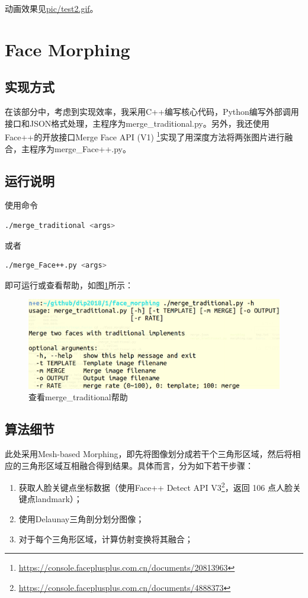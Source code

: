 \documentclass[a4paper]{article}
\begin{document}
动画效果见\underline{pic/test2.gif}。

\section{Face Morphing}
\subsection{实现方式}

在该部分中，考虑到实现效率，我采用C++编写核心代码，Python编写外部调用接口和JSON格式处理，主程序为merge\_traditional.py。另外，我还使用Face++的开放接口Merge Face API (V1) \footnote{\url{https://console.faceplusplus.com.cn/documents/20813963}}实现了用深度方法将两张图片进行融合，主程序为merge\_Face++.py。

\subsection{运行说明}
使用命令
\begin{lstlisting}[language=bash]
./merge_traditional <args>
\end{lstlisting}
或者
\begin{lstlisting}[language=bash]
./merge_Face++.py <args>
\end{lstlisting}
即可运行或查看帮助，如图\ref{fig:3-1}所示：
\begin{figure}[htp]
\centering
\includegraphics[width=1\linewidth]{3_1.png}
\caption{查看merge\_traditional帮助}
\label{fig:3-1}
\end{figure}

\subsection{算法细节}
此处采用Mesh-based Morphing\cite{FM}，即先将图像划分成若干个三角形区域，然后将相应的三角形区域互相融合得到结果。具体而言，分为如下若干步骤：
\begin{enumerate}
	\item 获取人脸关键点坐标数据（使用Face++ Detect API V3\footnote{\url{https://console.faceplusplus.com.cn/documents/4888373}}，返回 106 点人脸关键点landmark）；
	\item 使用Delaunay三角剖分\cite{DT}划分图像；
	\item 对于每个三角形区域，计算仿射变换将其融合；
\end{enumerate}
\end{document}
